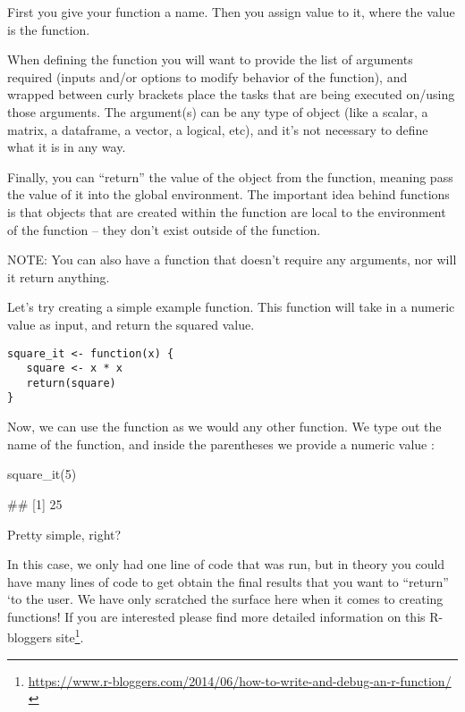 First you give your function a name.
Then you assign value to it, where the value is the function.

When defining the function you will want to provide the list of arguments required (inputs and/or options to modify behavior of the function), and wrapped between curly brackets place the tasks that are being executed on/using those arguments. The argument(s) can be any type of object (like a scalar, a matrix, a dataframe, a vector, a logical, etc), and it's not necessary to define what it is in any way.

Finally, you can ``return'' the value of the object from the function, meaning pass the value of it into the global environment. The important idea behind functions is that objects that are created within the function are local to the environment of the function -- they don’t exist outside of the function.

NOTE: You can also have a function that doesn't require any arguments, nor will it return anything.

Let's try creating a simple example function. This function will take in a numeric value as input, and return the squared value.
\begin{verbatim}
square_it <- function(x) { 
   square <- x * x
   return(square)
} 
\end{verbatim}

Now, we can use the function as we would any other function. We type out the name of the function, and inside the parentheses we provide a numeric value :

\begin{rblock1}
square_it(5)

## [1] 25
\end{rblock1}

Pretty simple, right?

In this case, we only had one line of code that was run, but in theory you could have many lines of code to get obtain the final results that you want to ``return'' `to the user. We have only scratched the surface here when it comes to creating functions! If you are interested please find more detailed information on this R-bloggers site\footnote{\websmall\url{https://www.r-bloggers.com/2014/06/how-to-write-and-debug-an-r-function/}}.


